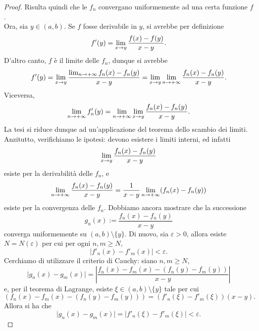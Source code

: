 \documentclass[Completo.tex]{subfiles}
\begin{document}
\begin{proof}
	Risulta quindi che le $f_n$ convergano uniformemente ad una certa funzione $f$. \\
	Ora, sia $y \in (a,b)$. Se $f$ fosse derivabile in $y$, si avrebbe per definizione
	\begin{equation*}
	f'(y) = \lim_{x \rightarrow y} \frac{f(x) - f(y)}{x-y}.
	\end{equation*}
	D'altro canto, $f$ è il limite delle $f_n$, dunque si avrebbe
	\begin{equation*}
	f'(y) = \lim_{x \rightarrow y} \frac{\lim_{n \rightarrow +\infty} f_n(x) - f_n(y)}{x-y} = \lim_{x \rightarrow y} \lim_{n \rightarrow +\infty} \frac{f_n(x) - f_n(y)}{x-y}.
	\end{equation*}
	Viceversa,
	\begin{equation*}
	\lim_{n \rightarrow +\infty} f'_n(y) = \lim_{n \rightarrow +\infty} \lim_{x \rightarrow y} \frac{f_n(x) - f_n(y)}{x-y}.
	\end{equation*}
	La tesi si riduce dunque ad un'applicazione del teorema dello scambio dei limiti. Anzitutto, verifichiamo le ipotesi: devono esistere i limiti interni, ed infatti
	\begin{equation*}
	\lim_{x \rightarrow y} \frac{f_n(x)-f_n(y)}{x-y}
	\end{equation*}
	esiste per la derivabilità delle $f_n$, e
	\begin{equation*}
	\lim_{n \rightarrow +\infty}\frac{f_n(x)-f_n(y)}{x-y} = \frac{1}{x-y}\lim_{n \rightarrow +\infty}(f_n(x) - f_n(y))
	\end{equation*}
	esiste per la convergenza delle $f_n$. Dobbiamo ancora mostrare che la successione
	\begin{equation*}
	g_n(x) := \frac{f_n(x) - f_n(y)}{x-y}
	\end{equation*}
	converga uniformemente su $(a,b) \setminus \{y\}$. Di nuovo, sia $\varepsilon > 0$, allora esiste $N = N(\varepsilon)$ per cui per ogni $n, m \geq N$,
	\begin{equation*}
	\vert f'_n(x) - f'_m(x) \vert < \varepsilon.
	\end{equation*} 
	Cerchiamo di utilizzare il criterio di Cauchy: siano $n, m \geq N$,
	\begin{equation*}
	\vert g_n(x) - g_m(x) \vert = \left\vert \frac{f_n(x) - f_m(x) - (f_n(y) - f_m(y))}{x-y} \right\vert
	\end{equation*}
	e, per il teorema di Lagrange, esiste $\xi \in (a,b) \setminus \{y\}$ tale per cui
	\begin{equation*}
	(f_n(x) - f_m(x) - (f_n(y) - f_m(y))) = (f'_n(\xi) - f'_m(\xi))(x-y).
	\end{equation*}
	Allora si ha che
	\begin{equation*}
	\vert g_n(x) - g_m(x) \vert = \vert f'_n(\xi) - f'_m(\xi) \vert < \varepsilon.
	\end{equation*}
\end{proof}
\end{document}
